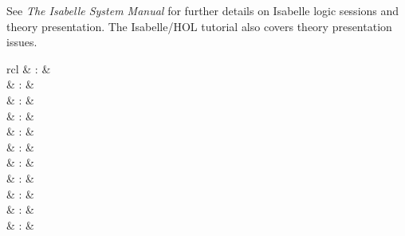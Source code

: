 \begin{isabellebody}
\begin{isamarkuptext}
  \medskip See \emph{The Isabelle System Manual} \cite{isabelle-sys}
  for further details on Isabelle logic sessions and theory
  presentation.  The Isabelle/HOL tutorial \cite{isabelle-hol-book}
  also covers theory presentation issues.%
\end{isamarkuptext}%
\isamarkuptrue%
%
\isamarkuptrue%
%
\begin{isamarkuptext}%
\begin{matharray}{rcl}
    \hypertarget{command.chapter}{\hyperlink{command.chapter}{\mbox{}}} & : &  \\
    \hypertarget{command.section}{\hyperlink{command.section}{\mbox{}}} & : &  \\
    \hypertarget{command.subsection}{\hyperlink{command.subsection}{\mbox{}}} & : &  \\
    \hypertarget{command.subsubsection}{\hyperlink{command.subsubsection}{\mbox{}}} & : &  \\
    \hypertarget{command.text}{\hyperlink{command.text}{\mbox{}}} & : &  \\
    \hypertarget{command.text-raw}{\hyperlink{command.text-raw}{\mbox{}}} & : &  \\[0.5ex]
    \hypertarget{command.sect}{\hyperlink{command.sect}{\mbox{}}} & : &  \\
    \hypertarget{command.subsect}{\hyperlink{command.subsect}{\mbox{}}} & : &  \\
    \hypertarget{command.subsubsect}{\hyperlink{command.subsubsect}{\mbox{}}} & : &  \\
    \hypertarget{command.txt}{\hyperlink{command.txt}{\mbox{}}} & : &  \\
    \hypertarget{command.txt-raw}{\hyperlink{command.txt-raw}{\mbox{}}} & : &  \\
  \end{matharray}


\end{isamarkuptext}
\end{isabellebody}
